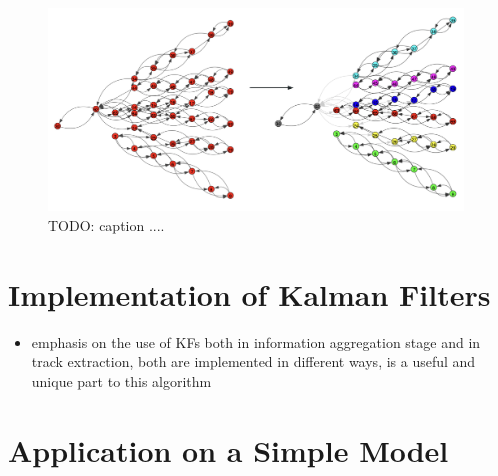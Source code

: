 \begin{figure}[htbp]
    \centering
    \includegraphics[width=0.98\textwidth]{images/5-gnn-algorithm/community-detection.png}
    \caption{TODO: caption ....}
    \label{fig:community-detection}%
\end{figure}






\section{Implementation of Kalman Filters}
\label{gnn-kf-implementation}

\begin{itemize}
\item emphasis on the use of KFs both in information aggregation stage and in track extraction, both are implemented in different ways, is a useful and unique part to this algorithm
\end{itemize}



\section{Application on a Simple Model}
\label{gnn-application-toy-model}




